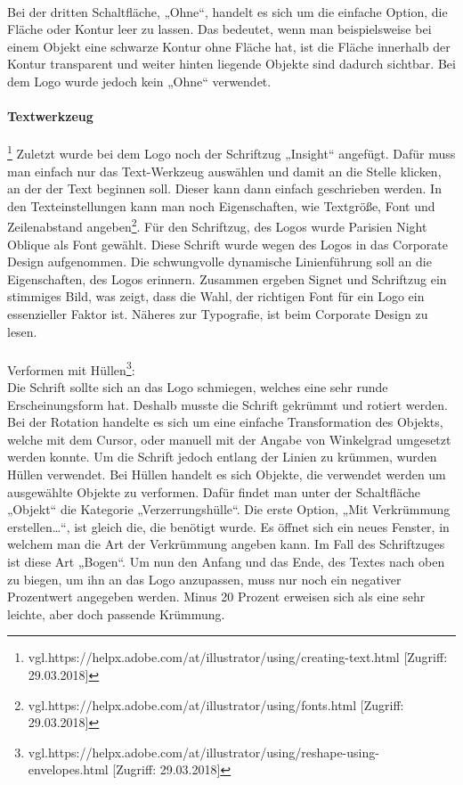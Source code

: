\leavevmode \\
Bei der dritten Schaltfläche, „Ohne“, handelt es sich um die einfache Option, die Fläche oder Kontur leer zu lassen. Das bedeutet, wenn man beispielsweise bei einem Objekt eine schwarze Kontur ohne Fläche hat, ist die Fläche innerhalb der Kontur transparent und weiter hinten liegende Objekte sind dadurch sichtbar. Bei dem Logo wurde jedoch kein „Ohne“ verwendet.

\paragraph{Textwerkzeug}\footnote{\label{} vgl.https://helpx.adobe.com/at/illustrator/using/creating-text.html [Zugriff: 29.03.2018]} 
Zuletzt wurde bei dem Logo noch der Schriftzug „Insight“ angefügt. Dafür muss man einfach nur das Text-Werkzeug auswählen und damit an die Stelle klicken, an der der Text beginnen soll. Dieser kann dann einfach geschrieben werden. In den Texteinstellungen kann man noch Eigenschaften, wie Textgröße, Font und Zeilenabstand angeben\footnote{\label{} vgl.https://helpx.adobe.com/at/illustrator/using/fonts.html [Zugriff: 29.03.2018]}.
Für den Schriftzug, des Logos wurde Parisien Night Oblique als Font gewählt. Diese Schrift wurde wegen des Logos in das Corporate Design aufgenommen. Die schwungvolle dynamische Linienführung soll an die Eigenschaften, des Logos erinnern. Zusammen ergeben Signet und Schriftzug ein stimmiges Bild, was zeigt, dass die Wahl, der richtigen Font für ein Logo ein essenzieller Faktor ist. Näheres zur Typografie, ist beim Corporate Design zu lesen.
\leavevmode \\
\leavevmode \\
Verformen mit Hüllen\footnote{\label{} vgl.https://helpx.adobe.com/at/illustrator/using/reshape-using-envelopes.html [Zugriff: 29.03.2018]}:
\leavevmode \\
Die Schrift sollte sich an das Logo schmiegen, welches eine sehr runde Erscheinungsform hat. Deshalb musste die Schrift gekrümmt und rotiert werden. Bei der Rotation handelte es sich um eine einfache Transformation des Objekts, welche mit dem Cursor, oder manuell mit der Angabe von Winkelgrad umgesetzt werden konnte. Um die Schrift jedoch entlang der Linien zu krümmen, wurden Hüllen verwendet. Bei Hüllen handelt es sich Objekte, die verwendet werden um ausgewählte Objekte zu verformen. Dafür findet man unter der Schaltfläche „Objekt“ die Kategorie „Verzerrungshülle“. Die erste Option, „Mit Verkrümmung erstellen…“, ist gleich die, die benötigt wurde. Es öffnet sich ein neues Fenster, in welchem man die Art der Verkrümmung angeben kann. Im Fall des Schriftzuges ist diese Art „Bogen“. Um nun den Anfang und das Ende, des Textes nach oben zu biegen, um ihn an das Logo anzupassen, muss nur noch ein negativer Prozentwert angegeben werden. Minus 20 Prozent erweisen sich als eine sehr leichte, aber doch passende Krümmung.
